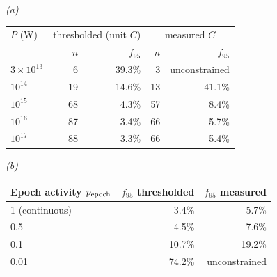 \emph{(a)}\\[2pt]
\begin{tabular}{@{}lrrrr@{}}
\toprule
$P$ (W) & \multicolumn{2}{c}{thresholded (unit $C$)} &
\multicolumn{2}{c}{measured $C$} \\
 & $n$ & $f_{95}$ & $n$ & $f_{95}$ \\
\midrule
$3\times10^{13}$ & 6 & 39.3\% & 3 & unconstrained \\
$10^{14}$ & 19 & 14.6\% & 13 & 41.1\% \\
$10^{15}$ & 68 & 4.3\% & 57 & 8.4\% \\
$10^{16}$ & 87 & 3.4\% & 66 & 5.7\% \\
$10^{17}$ & 88 & 3.3\% & 66 & 5.4\% \\
\bottomrule
\end{tabular}

\smallskip
\emph{(b)}\\[2pt]
\begin{tabular}{@{}lrr@{}}
\toprule
Epoch activity $p_{\rm epoch}$ & $f_{95}$ thresholded & $f_{95}$ measured \\
\midrule
1 (continuous) & 3.4\% & 5.7\% \\
0.5 & 4.5\% & 7.6\% \\
0.1 & 10.7\% & 19.2\% \\
0.01 & 74.2\% & unconstrained \\
\bottomrule
\end{tabular}
